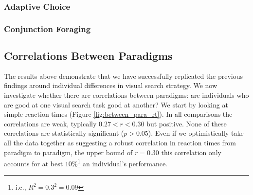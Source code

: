 \documentclass[]{rsos}%
\begin{document}
\subsubsection{Adaptive Choice}

\subsubsection{Conjunction Foraging}


\subsection{Correlations Between Paradigms}

The results above demonstrate that we have successfully replicated the previous findings around individual differences in visual search strategy. We now investigate whether there are correlations between paradigms: are individuals who are good at one visual search task good at another? We start by looking at simple reaction times (Figure \ref{fig:between_para_rt}). In all comparisons the correlations are weak, typically $0.27 < r <0.30$ but positive. None of these correlations are statistically significant ($p>0.05$). Even if we optimistically take all the data together as suggesting a robust correlation in reaction times from paradigm to paradigm, the upper bound of $r=0.30$ this correlation only accounts for at best $10\%$\footnote{i.e., $R^2 = 0.3^2 = 0.09$} an individual's performance. 
\end{document}
